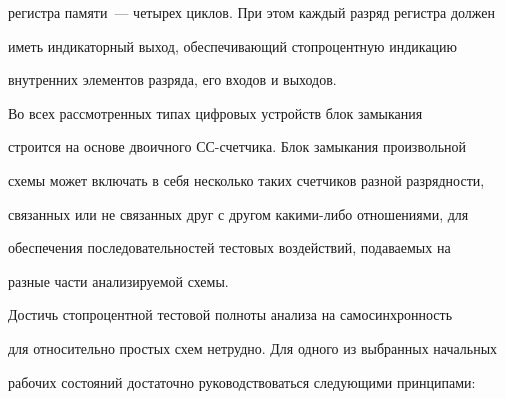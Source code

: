 регистра памяти~--- четырех циклов. При этом каждый разряд регистра должен 


иметь индикаторный выход, обеспечивающий стопроцентную индикацию 


внутренних элементов разряда, его входов и выходов.











      


      Во всех рассмотренных типах цифровых устройств блок замыкания 


строится на основе двоичного СС-счет\-чи\-ка. Блок замыкания произвольной 


схемы может включать в себя несколько таких счетчиков разной разрядности, 


связанных или не связанных друг с другом какими-либо отношениями, для 


обеспечения последовательностей тестовых воздействий, подаваемых на 


разные части анализируемой схемы.


      


      Достичь стопроцентной тестовой полноты анализа на самосинхронность 


для относительно простых схем нетрудно. Для одного из выбранных начальных 


рабочих состояний достаточно руководствоваться следующими принципами:


